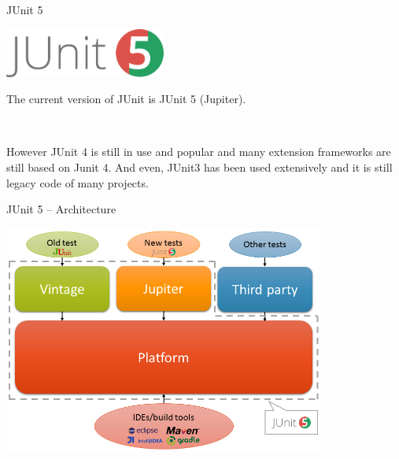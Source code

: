 \documentclass[11pt, xcolor=svgnames]{beamer}
\begin{document}

\begin{frame}{JUnit 5}

\begin{center}
  \includegraphics[width=150pt]{./figs/jUnit5Logo}
\end{center}
  
The current version of JUnit is JUnit 5 (Jupiter).

~

However JUnit 4 is still in use and popular and many extension frameworks are still based on Junit 4. And even, JUnit3 has been used extensively and it is still legacy code of many projects.

%

\end{frame}



\begin{frame}{JUnit 5 -- Architecture }

  \begin{center}
    \includegraphics[width=300pt]{./figs/jUnit5Architecture}
  \end{center}
     
  \end{frame}

  
\end{document}

